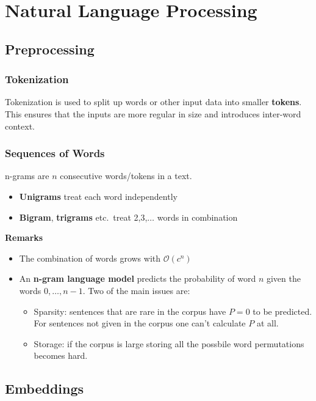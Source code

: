 \section{Natural Language Processing}
\subsection{Preprocessing}
\subsubsection{Tokenization}
Tokenization is used to split up words or other input data into smaller \textbf{tokens}. This ensures that the inputs are more regular in size and introduces inter-word context.

\subsubsection{Sequences of Words}
n-grams are $n$ consecutive words/tokens in a text.
\begin{itemize}
    \item \textbf{Unigrams} treat each word independently
    \item \textbf{Bigram}, \textbf{trigrams} etc.\ treat 2,3,$\ldots$ words in combination
\end{itemize}
\textbf{Remarks}
\begin{itemize}
    \item The combination of words grows with $\mathcal{O}(c^n)$
    \item An \textbf{n-gram language model} predicts the probability of word $n$ given the words $0,\dots,n-1$. Two of the main issues are:
          \begin{itemize}
              \item Sparsity: sentences that are rare in the corpus have $P=0$ to be predicted. For sentences not given in the corpus one can't calculate $P$ at all.
              \item Storage: if the corpus is large storing all the possbile word permutations becomes hard.
          \end{itemize}
\end{itemize}
\subsection{Embeddings}

